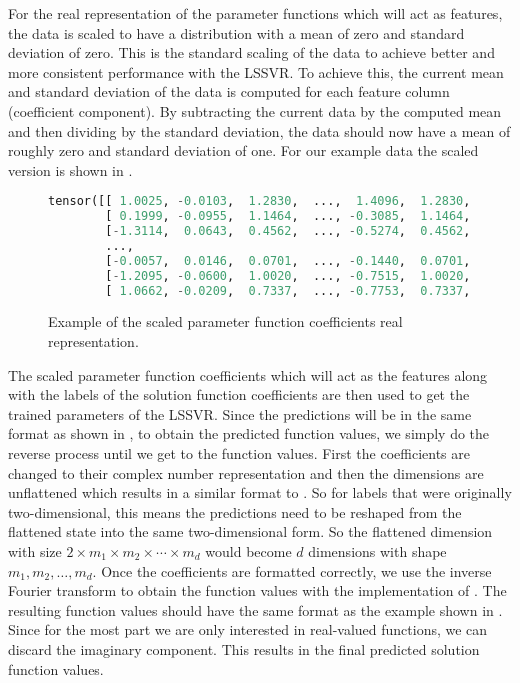For the real representation of the parameter functions which will act as features, the data is scaled to have a distribution with a mean of zero and standard deviation of zero. This is the standard scaling of the data to achieve better and more consistent performance with the LSSVR\@. To achieve this, the current mean and standard deviation of the data is computed for each feature column (coefficient component). By subtracting the current data by the computed mean and then dividing by the standard deviation, the data should now have a mean of roughly zero and standard deviation of one. For our example data the scaled version is shown in .
\begin{figure}[H]
  \centering
  \begin{lstlisting}[language=Python]
tensor([[ 1.0025, -0.0103,  1.2830,  ...,  1.4096,  1.2830,  1.5487],
        [ 0.1999, -0.0955,  1.1464,  ..., -0.3085,  1.1464,  1.2894],
        [-1.3114,  0.0643,  0.4562,  ..., -0.5274,  0.4562,  1.0442],
        ...,
        [-0.0057,  0.0146,  0.0701,  ..., -0.1440,  0.0701, -0.9666],
        [-1.2095, -0.0600,  1.0020,  ..., -0.7515,  1.0020,  1.1511],
        [ 1.0662, -0.0209,  0.7337,  ..., -0.7753,  0.7337, -1.2024]])
  \end{lstlisting}
  \caption{Example of the scaled parameter function coefficients real representation.}\label{fig:example_scaled_data}
\end{figure}

The scaled parameter function coefficients which will act as the features along with the labels of the solution function coefficients are then used to get the trained parameters of the LSSVR\@. Since the predictions will be in the same format as shown in , to obtain the predicted function values, we simply do the reverse process until we get to the function values. First the coefficients are changed to their complex number representation and then the dimensions are unflattened which results in a similar format to . So for labels that were originally two-dimensional, this means the predictions need to be reshaped from the flattened state into the same two-dimensional form. So the flattened dimension with size \(2\times m_1\times m_2 \times\cdots\times m_d\) would become \(d\) dimensions with shape \(m_1, m_2, \ldots, m_d\). Once the coefficients are formatted correctly, we use the inverse Fourier transform to obtain the function values with the implementation of . The resulting function values should have the same format as the example shown in . Since for the most part we are only interested in real-valued functions, we can discard the imaginary component. This results in the final predicted solution function values.

